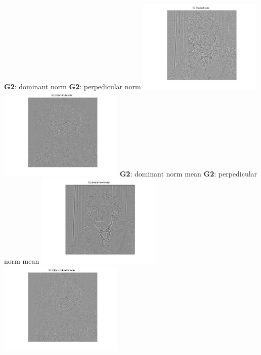 \documentclass[12pt,twoside]{article}
\newcommand{\tabUnit}{3ex}
\newcommand{\tabT}{\hspace*{\tabUnit}}
\begin{document}
\tabT\tabT\tabT\tabT\tabT\tabT\tabT
\tabT\tabT\tabT\tabT \textbf{G2}: dominant norm
\tabT\tabT\tabT\tabT \textbf{G2}: perpedicular norm
\newline
\tabT\tabT\tabT\tabT\tabT\tabT\tabT\tabT
\includegraphics[width = 168pt, trim = 80pt 20pt 100pt 30pt, clip]{G2dn}
\includegraphics[width = 168pt, trim = 80pt 20pt 100pt 30pt, clip]{G2pn}
\newline
\tabT\tabT\tabT\tabT\tabT\tabT\tabT\tabT 
\tabT\tabT \textbf{G2}: dominant norm mean
\tabT\tabT \textbf{G2}: perpedicular norm mean
\newline
\tabT\tabT\tabT\tabT\tabT\tabT\tabT\tabT
\includegraphics[width = 168pt, trim = 80pt 20pt 100pt 30pt, clip]{G2dnm}
\includegraphics[width = 168pt, trim = 80pt 20pt 100pt 30pt, clip]{G2pnm}
\end{document}
